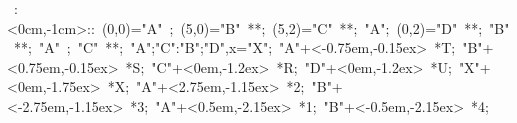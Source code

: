 

\hbox{
\xy    <1cm,0cm>:<0cm,-1cm>::
       (0,0)="A" ; (5,0)="B" **\dir{-}; 
       (5,2)="C" **\dir{-}; "A"; (0,2)="D" **\dir{-}; "B" **\dir{-};
       "A" ; "C" **\dir{-}; {"A";"C":"B";"D",x}="X";
       "A"+<-0.75em,-0.15ex> *{T};
       "B"+<0.75em,-0.15ex> *{S};
       "C"+<0em,-1.2ex> *{R};
       "D"+<0em,-1.2ex> *{U};
       "X"+<0em,-1.75ex> *{X};
       "A"+<2.75em,-1.15ex> *{2};
       "B"+<-2.75em,-1.15ex> *{3};
       "A"+<0.5em,-2.15ex> *{1};
       "B"+<-0.5em,-2.15ex> *{4};
       \endxy}
	   
